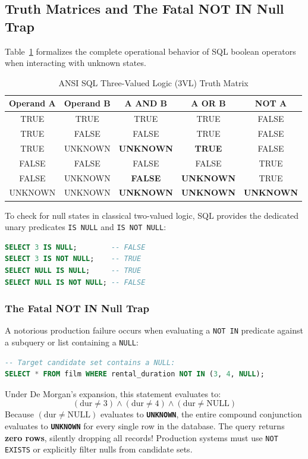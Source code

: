 \documentclass[10pt,twocolumn,letterpaper]{article}
\begin{document}
\subsection{Truth Matrices and The Fatal NOT IN Null Trap}
Table~\ref{tab:3vl_truth} formalizes the complete operational behavior of SQL boolean operators when interacting with unknown states.

\begin{table}[htbp]
\caption{ANSI SQL Three-Valued Logic (3VL) Truth Matrix}
\label{tab:3vl_truth}
\centering
\scriptsize
\begin{tabular}{ccccc}
\toprule
\textbf{Operand A} & \textbf{Operand B} & \textbf{A AND B} & \textbf{A OR B} & \textbf{NOT A} \\
\midrule
TRUE & TRUE & TRUE & TRUE & FALSE \\
TRUE & FALSE & FALSE & TRUE & FALSE \\
TRUE & UNKNOWN & \textbf{UNKNOWN} & \textbf{TRUE} & FALSE \\
\midrule
FALSE & FALSE & FALSE & FALSE & TRUE \\
FALSE & UNKNOWN & \textbf{FALSE} & \textbf{UNKNOWN} & TRUE \\
\midrule
UNKNOWN & UNKNOWN & \textbf{UNKNOWN} & \textbf{UNKNOWN} & \textbf{UNKNOWN} \\
\bottomrule
\end{tabular}
\end{table}

To check for null states in classical two-valued logic, SQL provides the dedicated unary predicates \texttt{IS NULL} and \texttt{IS NOT NULL}:
\begin{lstlisting}[language=SQL]
SELECT 3 IS NULL;        -- FALSE
SELECT 3 IS NOT NULL;    -- TRUE
SELECT NULL IS NULL;     -- TRUE
SELECT NULL IS NOT NULL; -- FALSE
\end{lstlisting}

\subsubsection{The Fatal NOT IN Null Trap}
A notorious production failure occurs when evaluating a \texttt{NOT IN} predicate against a subquery or list containing a \texttt{NULL}:
\begin{lstlisting}[language=SQL]
-- Target candidate set contains a NULL:
SELECT * FROM film WHERE rental_duration NOT IN (3, 4, NULL);
\end{lstlisting}
Under De Morgan's expansion, this statement evaluates to:
\begin{equation}
(\text{dur} \neq 3) \land (\text{dur} \neq 4) \land (\text{dur} \neq \text{NULL})
\end{equation}
Because $(\text{dur} \neq \text{NULL})$ evaluates to \textbf{\texttt{UNKNOWN}}, the entire compound conjunction evaluates to \textbf{\texttt{UNKNOWN}} for every single row in the database. The query returns \textbf{zero rows}, silently dropping all records! Production systems must use \texttt{NOT EXISTS} or explicitly filter nulls from candidate sets.
\end{document}

